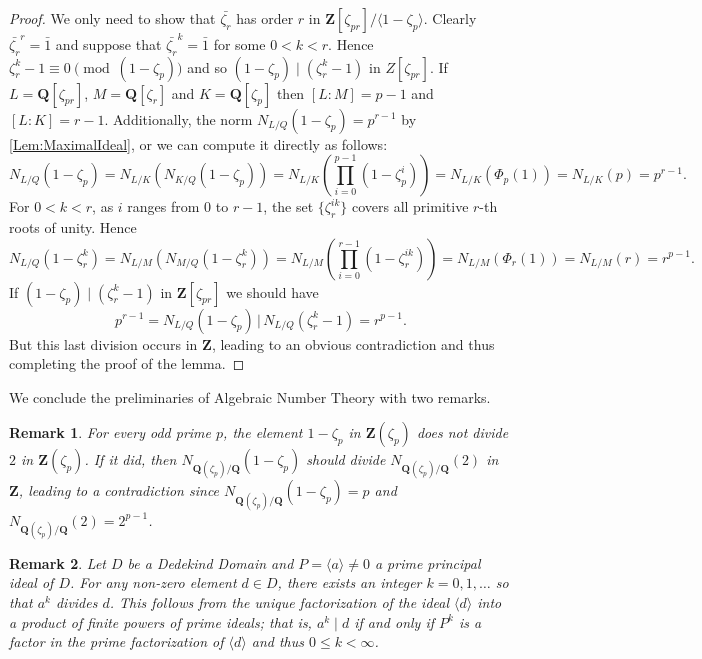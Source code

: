 \documentclass[10pt,a4paper]{amsart}
\newtheorem{remark}{Remark}
\def\Z{\mathbf{Z}}
\def\Q{\mathbf{Q}}
\begin{document}
\begin{proof}
We only need to show that $\bar{\zeta_r}$ has order $r$ in $\Z[\zeta_{pr}]/\langle 1- \zeta_p \rangle$.
Clearly $\bar{\zeta_r}^r= \bar{1}$  and suppose that 
$\bar{\zeta_r}^k= \bar{1}$ for some $0 < k < r$. 
Hence $\zeta_r^k-1 \equiv 0 \pmod{(1- \zeta_p)}$  and so 
$(1- \zeta_p) \mid (\zeta_r^k-1)$ in $Z[\zeta_{pr}]$.
If $L = \Q[\zeta_{pr}]$, $M= \Q[\zeta_r]$ and $K= \Q[\zeta_p]$ then $[L:M]= p-1$ and  $[L:K]= r-1$. Additionally, the norm \( N_{L/Q}(1- \zeta_p) = p^{r-1} \) by  \autoref{Lem:MaximalIdeal}, or we can compute it directly as follows:
\[
N_{L/Q}(1- \zeta_p) = N_{L/K}(N_{K/Q}(1 - \zeta_p)) = N_{L/K}\left(\prod_{i=0}^{p-1} (1-\zeta_p^i)\right) = N_{L/K}(\Phi_p(1)) = N_{L/K}(p) = p^{r-1}. 
\]
For $0 < k < r$, as $i$ ranges from $0$ to $r-1$, the set $\{ \zeta_r^{ik} \}$ covers all primitive $r$-th roots of unity. Hence 
\[N_{L/Q}(1- \zeta_r^k)= N_{L/M}(N_{M/Q}(1 - \zeta_r^k))=N_{L/M}\left(\prod_{i=0}^{r-1} (1-\zeta_r^{ik})\right)=
N_{L/M}(\Phi_r(1))= N_{L/M}(r)=r^{p-1}. 
\]
If $(1 - \zeta_p) \mid (\zeta_r^k - 1)$ in $\Z[\zeta_{pr}]$  we should have 
\[
p^{r-1}= N_{L/Q} (1-\zeta_p) \, \big| \,  N_{L/Q}(\zeta_r^k-1)= r^{p-1}.
\]
But this last division occurs in $\Z$, leading to an obvious contradiction and thus completing the proof of the lemma.
\end{proof}

We conclude the preliminaries of Algebraic Number Theory with two remarks.
\begin{remark}\label{remark1}
 For every odd prime $p$, the element $1 - \zeta_p$ in $\Z(\zeta_p)$ does not divide $2$ in $\Z(\zeta_p)$. If it did, then $N_{\Q(\zeta_p)/\Q}(1 - \zeta_p)$ should divide $N_{\Q(\zeta_p)/\Q}(2)$ in $\Z$, leading to a contradiction since $N_{\Q(\zeta_p)/\Q}(1 - \zeta_p) = p$ and $N_{\Q(\zeta_p)/\Q}(2) = 2^{p-1}$.
\end{remark}


\begin{remark}\label{remark2}
Let $D$ be a Dedekind Domain and $P = \langle a \rangle \neq 0$ a prime principal ideal of $D$. For any non-zero element $d \in D$, there exists an integer $k = 0,1, \ldots $ so that $a^k$ divides $d$. This follows from the unique factorization of the ideal $\langle d \rangle$ into a product of finite powers of prime ideals; that is, $a^k \mid d$ if and only if $P^k$ is a factor in the prime factorization of $\langle d \rangle$ and thus $0 \leq k < \infty$. 
\end{remark}
\end{document}
